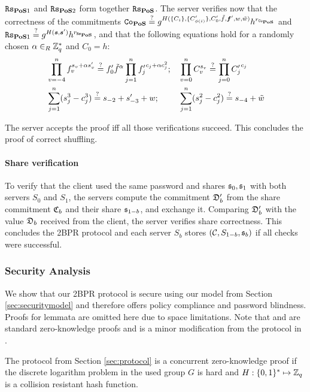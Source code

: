 \noindent
$\mathtt{Rs}_{\mathsf{\bf PoS}1}$ and $\mathtt{Rs}_{\mathsf{\bf PoS}2}$ form together $\mathtt{Rs}_{\mathsf{\bf PoS}}$.
The server verifies now that the correctness of the commitments
$\mathtt{Co}_\mathsf{\bf PoS} \stackrel{?}{=} g^{H(\{C_i\}, \{C'_{\phi(i)}\}, C'_0, \tilde{f}, \bm f', w, \tilde{w})} h^{r_{\mathtt{Co}_\mathsf{\bf PoS}}}$ and
$\mathtt{Rs}_{\mathsf{\bf PoS}1} \stackrel{?}{=} g^{H(\bm s, \bm s')} h^{r_{\mathtt{Rs}_\mathsf{\bf PoS}}}$,
and that the following equations hold for a randomly chosen $\alpha\in_R\mathbb{Z}^\ast_q$ and $C_0=h$:
\begin{align*}
  & \prod_{v=-4}^{n} f_v^{s_v+\alpha s'_v}  \stackrel{?}{=}  f'_0\tilde{f}^\alpha \prod_{j=1}^n {f'_j}^{c_j+\alpha c_j^2};
  &&  \prod_{v=0}^n C_v^{s_v}  \stackrel{?}{=}  \prod_{j=0}^n {C'_j}^{c_j} \\
  & \sum_{j=1}^n (s_j^3 - c_j^3)  \stackrel{?}{=}  s_{-2} + s'_{-3} + w;
  &&  \sum_{j=1}^n (s_j^2 - c_j^2)  \stackrel{?}{=}  s_{-4} + \tilde{w} 
\end{align*}

\noindent
The server accepts the proof iff all those verifications succeed.
This concludes the proof of correct shuffling.

\paragraph{Share verification}
To verify that the client used the same password \pwd and shares $\mathfrak{s}_0,\mathfrak{s}_1$ with both servers $S_0$ and $S_1$, the servers compute the commitment $\mathfrak{D}'_b$ from the share commitment $\mathfrak{C}_b$ and their share $\mathfrak{s}_{1-b}$, and exchange it.
Comparing $\mathfrak{D}'_b$ with the value $\mathfrak{D}_b$ received from the client, the server verifies share correctness.
This concludes the 2BPR protocol and each server $S_b$ stores $(\mathcal{C},S_{1-b},\mathfrak{s}_b)$ if all checks were successful.

\subsubsection{Security Analysis}
We show that our 2BPR protocol is secure using our model from Section \ref{sec:securitymodel} and therefore offers policy compliance and password blindness.
Proofs for lemmata are omitted here due to space limitations.
Note that \PoM and \PoC are standard zero-knowledge proofs and \PoS is a minor modification from the protocol in \cite{FurukawaS01,Furukawa05}.

\begin{lemma}\label{lem:poc}
  The \PoC protocol from Section \ref{sec:protocol} is a concurrent zero-knowledge proof if the discrete logarithm problem in the used group $G$ is hard and $H:\{0,1\}^\ast\mapsto\mathbb{Z}_q$ is a collision resistant hash function.
\end{lemma}


